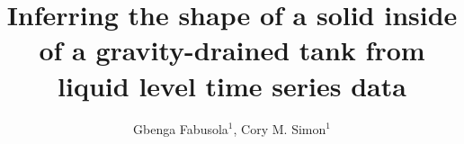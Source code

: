 \documentclass[openacc]{rsproca_new}%
\begin{document}
\title{Inferring the shape of a solid inside of a gravity-drained tank from liquid level time series data}


\author{%
Gbenga Fabusola$^{1}$, 
Cory M. Simon$^{1}$
}

\address{$^{1}$School of Chemical, Biological, and Environmental Engineering. Oregon State University. Corvallis, OR, USA.
}

\subject{applied mathematics, chemical engineering}


\end{document}
